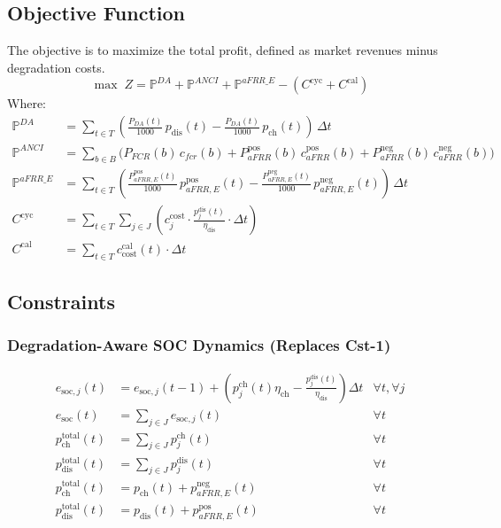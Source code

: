 \documentclass[11pt, a4paper]{article}
\begin{document}
\subsection{Objective Function}
The objective is to maximize the total profit, defined as market revenues minus degradation costs.
\begin{equation}
\max \; Z = \mathbb{P}^{DA} + \mathbb{P}^{ANCI} + \mathbb{P}^{aFRR\_E} - (C^{\mathrm{cyc}} + C^{\mathrm{cal}})
\end{equation}
Where:
\begin{align}
\mathbb{P}^{DA} &= \sum_{t\in T} \left( \frac{P_{DA}(t)}{1000}\, p_{\mathrm{dis}}(t) - \frac{P_{DA}(t)}{1000}\, p_{\mathrm{ch}}(t) \right)\, \Delta t \\
\mathbb{P}^{ANCI} &= \sum_{b\in B} \Big( P_{FCR}(b)\, c_{fcr}(b) + P^{\mathrm{pos}}_{aFRR}(b)\, c^{\mathrm{pos}}_{aFRR}(b) + P^{\mathrm{neg}}_{aFRR}(b)\, c^{\mathrm{neg}}_{aFRR}(b) \Big) \\
\mathbb{P}^{aFRR\_E} &= \sum_{t\in T} \left( \frac{P^{\mathrm{pos}}_{aFRR, E}(t)}{1000}\, p^{\mathrm{pos}}_{aFRR, E}(t) - \frac{P^{\mathrm{neg}}_{aFRR, E}(t)}{1000}\, p^{\mathrm{neg}}_{aFRR, E}(t) \right)\, \Delta t \\
C^{\mathrm{cyc}} &= \sum_{t \in T} \sum_{j \in J} \left( c^{\mathrm{cost}}_{j} \cdot \frac{p^{\mathrm{dis}}_{j}(t)}{\eta_{\mathrm{dis}}} \cdot \Delta t \right) \\
C^{\mathrm{cal}} &= \sum_{t \in T} c^{\mathrm{cal}}_{\mathrm{cost}}(t) \cdot \Delta t
\end{align}

\subsection{Constraints}

\subsubsection{Degradation-Aware SOC Dynamics (Replaces Cst-1)}
\begin{align}
e_{\mathrm{soc},j}(t) &= e_{\mathrm{soc},j}(t-1) + \left( p^{\mathrm{ch}}_{j}(t) \eta_{\mathrm{ch}} - \frac{p^{\mathrm{dis}}_{j}(t)}{\eta_{\mathrm{dis}}} \right) \Delta t & \forall t, \forall j \\
e_{\mathrm{soc}}(t) &= \sum_{j \in J} e_{\mathrm{soc},j}(t) & \forall t \\
p^{\mathrm{total}}_{\mathrm{ch}}(t) &= \sum_{j \in J} p^{\mathrm{ch}}_{j}(t) & \forall t \\
p^{\mathrm{total}}_{\mathrm{dis}}(t) &= \sum_{j \in J} p^{\mathrm{dis}}_{j}(t) & \forall t \\
p^{\mathrm{total}}_{\mathrm{ch}}(t) &= p_{\mathrm{ch}}(t) + p^{\mathrm{neg}}_{aFRR,E}(t) & \forall t \\
p^{\mathrm{total}}_{\mathrm{dis}}(t) &= p_{\mathrm{dis}}(t) + p^{\mathrm{pos}}_{aFRR,E}(t) & \forall t
\end{align}
\end{document}
